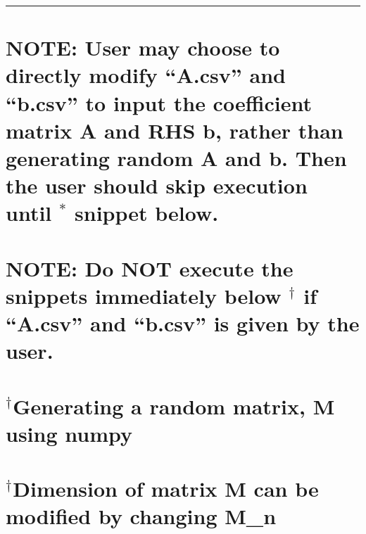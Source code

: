 \documentclass[11pt]{article}
\begin{document}
    \begin{center}\rule{0.5\linewidth}{0.5pt}\end{center}

    \hypertarget{note-user-may-choose-to-directly-modify-a.csv-and-b.csv-to-input-the-coefficient-matrix-a-and-rhs-b-rather-than-generating-random-a-and-b.-then-the-user-should-skip-execution-until-snippet-below.}{%
\section{\texorpdfstring{NOTE: User may choose to directly modify
``A.csv'' and ``b.csv'' to input the coefficient matrix A and RHS b,
rather than generating random A and b. Then the user should skip
execution until \(^*\) snippet
below.}{NOTE: User may choose to directly modify ``A.csv'' and ``b.csv'' to input the coefficient matrix A and RHS b, rather than generating random A and b. Then the user should skip execution until \^{}* snippet below.}}\label{note-user-may-choose-to-directly-modify-a.csv-and-b.csv-to-input-the-coefficient-matrix-a-and-rhs-b-rather-than-generating-random-a-and-b.-then-the-user-should-skip-execution-until-snippet-below.}}

    \hypertarget{note-do-not-execute-the-snippets-immediately-below-dagger-if-a.csv-and-b.csv-is-given-by-the-user.}{%
\section{\texorpdfstring{NOTE: Do NOT execute the snippets immediately
below \(^\dagger\) if ``A.csv'' and ``b.csv'' is given by the
user.}{NOTE: Do NOT execute the snippets immediately below \^{}\textbackslash{}dagger if ``A.csv'' and ``b.csv'' is given by the user.}}\label{note-do-not-execute-the-snippets-immediately-below-dagger-if-a.csv-and-b.csv-is-given-by-the-user.}}

    \hypertarget{daggergenerating-a-random-matrix-m-using-numpy}{%
\section{\texorpdfstring{\(^\dagger\)Generating a random matrix, M using
numpy}{\^{}\textbackslash{}daggerGenerating a random matrix, M using numpy}}\label{daggergenerating-a-random-matrix-m-using-numpy}}

    \hypertarget{daggerdimension-of-matrix-m-can-be-modified-by-changing-m_n}{%
\section{\texorpdfstring{\(^\dagger\)Dimension of matrix M can be
modified by changing
M\_n}{\^{}\textbackslash{}daggerDimension of matrix M can be modified by changing M\_n}}\label{daggerdimension-of-matrix-m-can-be-modified-by-changing-m_n}}
\end{document}
